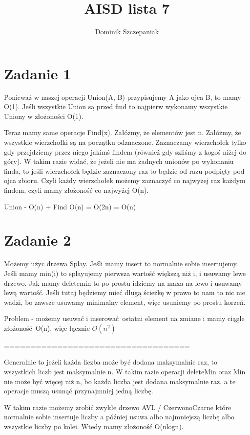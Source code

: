 \documentclass[12pt]{article}
\title{AISD lista 7}
\author{Dominik Szczepaniak}
\begin{document}
\maketitle

\bgroup\obeylines

\section{Zadanie 1}
Ponieważ w naszej operacji Union(A, B) przypisujemy A jako ojca B, to mamy O(1). Jeśli wszystkie Union są przed find to najpierw wykonamy wszystkie Uniony w złożoności O(1). 

Teraz mamy same operacje Find(x). Załóżmy, że elementów jest n. Załóżmy, że wszystkie wierzchołki są na początku odznaczone. Zaznaczamy wierzchołek tylko gdy przejdziemy przez niego jakimś findem (również gdy szliśmy z kogoś niżej do góry). W takim razie widać, że jeżeli nie ma żadnych unionów po wykonaniu finda, to jeśli wierzchołek będzie zaznaczony raz to będzie od razu podpięty pod ojca zbioru. Czyli każdy wierzchołek możemy zaznaczyć co najwyżej raz każdym findem, czyli mamy złożoność co najwyżej O(n).

Union - O(n) + Find O(n) = O(2n) = O(n)
\section{Zadanie 2}
Możemy użyc drzewa Splay. Jeśli mamy insert to normalnie sobie insertujemy. Jeśli mamy min(i) to splayujemy pierwsza wartość większą niż i, i usuwamy lewe drzewo. Jak mamy deletemin to po prostu idziemy na maxa na lewo i usuwamy lewą wartość. Jeśli tutaj będziemy mieć długą ścieżkę w prawo to nam to nic nie wadzi, bo zawsze usuwamy minimalny element, więc usuniemy po prostu korzeń. 


Problem - możemy usuwać i inserować ostatni element na zmiane i mamy ciągle złożoność O(n), więc łącznie $O(n^2)$

===================================

Generalnie to jeżeli każda liczba może być dodana maksymalnie raz, to wszystkich liczb jest maksymalnie n. 
W takim razie operacji deleteMin oraz Min nie może być więcej niż n, bo każda liczba jest dodana maksymalnie raz, a te operacje muszą usunąć przynajmniej jedną liczbę. 

W takim razie możemy zrobić zwykłe drzewo AVL / CzerwonoCzarne które normalnie sobie insertuje liczby a później usuwa albo najmniejszą liczbę albo wszystkie liczby po kolei. Wtedy mamy złożoność O(nlogn).
\end{document}
